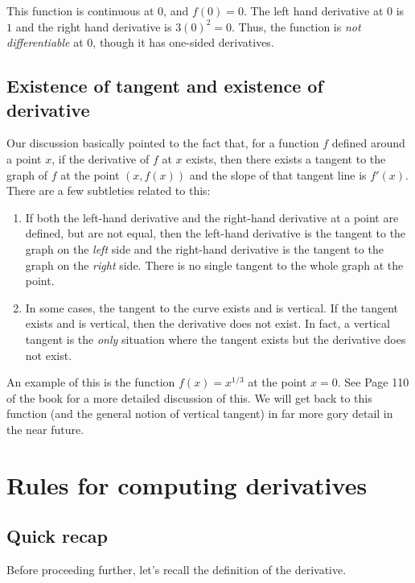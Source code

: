 \documentclass[10pt]{amsart}
\begin{document}
This function is continuous at $0$, and $f(0) = 0$. The left hand
derivative at $0$ is $1$ and the right hand derivative is $3(0)^2 =
0$. Thus, the function is {\em not differentiable} at $0$, though it
has one-sided derivatives.

\subsection{Existence of tangent and existence of derivative}

Our discussion basically pointed to the fact that, for a function $f$
defined around a point $x$, if the derivative of $f$ at $x$ exists,
then there exists a tangent to the graph of $f$ at the point
$(x,f(x))$ and the slope of that tangent line is $f'(x)$. There are a
few subtleties related to this:

\begin{enumerate}
\item If both the left-hand derivative and the right-hand derivative
  at a point are defined, but are not equal, then the left-hand
  derivative is the tangent to the graph on the {\em left} side and
  the right-hand derivative is the tangent to the graph on the {\em
  right} side. There is no single tangent to the whole graph at the
  point.
\item In some cases, the tangent to the curve exists and is
  vertical. If the tangent exists and is vertical, then the derivative
  does not exist. In fact, a vertical tangent is the {\em only}
  situation where the tangent exists but the derivative does not
  exist.
\end{enumerate}

An example of this is the function $f(x) = x^{1/3}$ at the point $x =
0$. See Page 110 of the book for a more detailed discussion of
this. We will get back to this function (and the general notion of
vertical tangent) in far more gory detail in the near future.

\section{Rules for computing derivatives}

\subsection{Quick recap}

Before proceeding further, let's recall the definition of the derivative.
\end{document}
